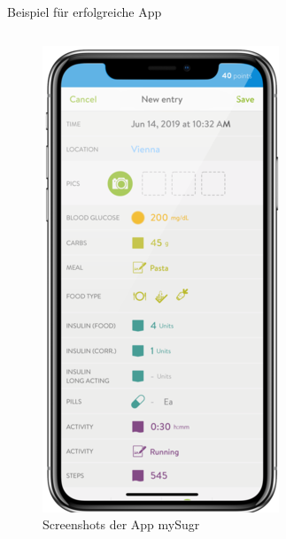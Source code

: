 \begin{frame}{Beispiel für erfolgreiche App}
\begin{columns}
\begin{column}{0.6\textwidth}
\begin{figure}
\begin{minipage}{0.33\textwidth}
                    \includegraphics[width=\textwidth]{Bilder/mysugr3.png}
                \end{minipage}
                \vspace{0.1cm}
                \caption{Screenshots der App mySugr \cite{mysugr}}

\end{figure}
\end{column}
\end{columns}
\end{frame}
